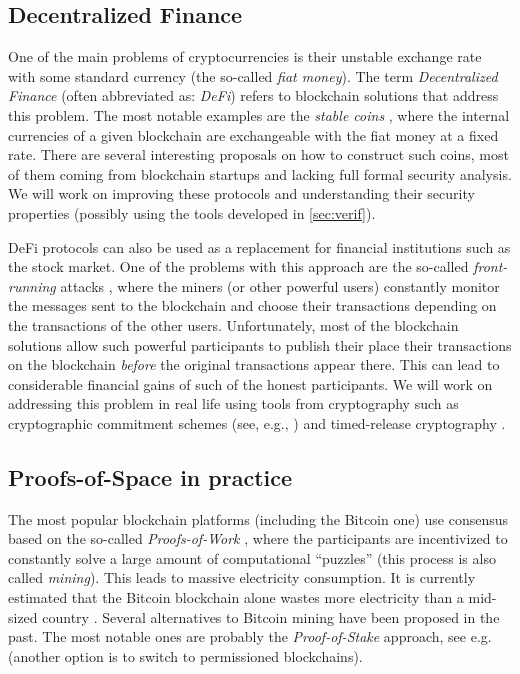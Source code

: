 \documentclass{article}
\begin{document}
\subsection{Decentralized Finance}

One of the main problems of cryptocurrencies is their unstable exchange rate with some standard currency (the so-called \emph{fiat money}). The term \emph{Decentralized Finance} \cite{enwiki:1030159409} (often abbreviated as: \emph{DeFi}) refers to blockchain solutions that address this problem. The most notable examples are the \emph{stable coins} \cite{Clark2020}, where the internal currencies of a given blockchain are exchangeable with the fiat money at a fixed rate. There are several interesting proposals on how to construct such coins, most of them coming from blockchain startups and lacking full formal security analysis. We will work on improving these protocols and understanding their security properties (possibly using the tools developed in \ref{sec:verif}).
	
DeFi protocols can also be used as a replacement for financial institutions such as the stock market. One of the problems with this approach are the so-called \emph{front-running} attacks \cite{Eskandari2019}, where the miners (or other powerful users) constantly monitor the messages sent to the blockchain and choose their transactions depending on the transactions of the other users. Unfortunately, most of the blockchain solutions allow such powerful participants to publish their place their transactions on the blockchain \emph{before} the original transactions appear there. This can lead to considerable financial gains of such of the honest participants. We will work on addressing this problem in real life using tools from cryptography such as cryptographic commitment schemes (see, e.g., \cite{Goldreich2001}) and timed-release cryptography \cite{10.5555/888615}.

\subsection{Proofs-of-Space in practice}\label{sec:PoSpace}

The most popular blockchain platforms (including the Bitcoin one) use consensus based on the so-called \emph{Proofs-of-Work} \cite{Dwork1992}, where the participants are incentivized to constantly solve a large amount of computational ``puzzles'' (this process is also called \emph{mining}). This leads to massive electricity consumption. It is currently estimated that the Bitcoin blockchain alone wastes more electricity than a mid-sized country \cite{Criddle}. Several alternatives to Bitcoin mining have been proposed in the past. The most notable ones are probably the \emph{Proof-of-Stake} approach, see e.g.~\cite{Kiayias2017} (another option is to switch to permissioned blockchains).
\end{document}
